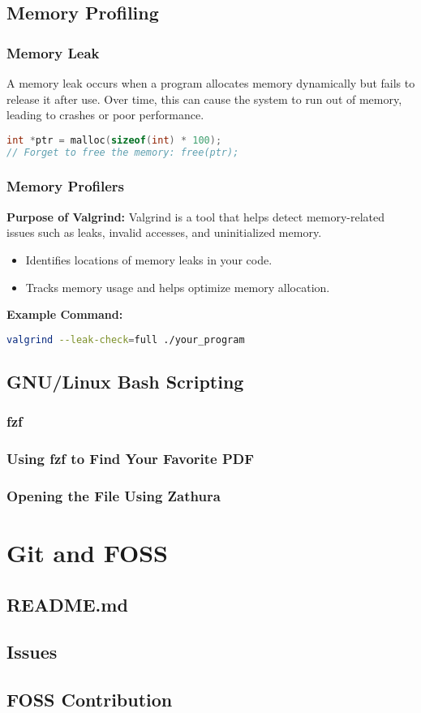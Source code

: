 \documentclass{article}
\begin{document}
\subsection{Memory Profiling}

\subsubsection{Memory Leak}
A memory leak occurs when a program allocates memory dynamically but fails to release it after use. Over time, this can cause the system to run out of memory, leading to crashes or poor performance.
\begin{lstlisting}[language=C]
int *ptr = malloc(sizeof(int) * 100);
// Forget to free the memory: free(ptr);
\end{lstlisting}

\subsubsection{Memory Profilers}
\textbf{Purpose of Valgrind:}
Valgrind is a tool that helps detect memory-related issues such as leaks, invalid accesses, and uninitialized memory.
\begin{itemize}
    \item Identifies locations of memory leaks in your code.
    \item Tracks memory usage and helps optimize memory allocation.
\end{itemize}
\textbf{Example Command:}
\begin{lstlisting}[language=bash]
valgrind --leak-check=full ./your_program
\end{lstlisting}

\subsection{GNU/Linux Bash Scripting}

\subsubsection{fzf}

\subsubsection{Using fzf to Find Your Favorite PDF}

\subsubsection{Opening the File Using Zathura}

\section{Git and FOSS}
\subsection{README.md}

\subsection{Issues}

\subsection{FOSS Contribution}
\end{document}
